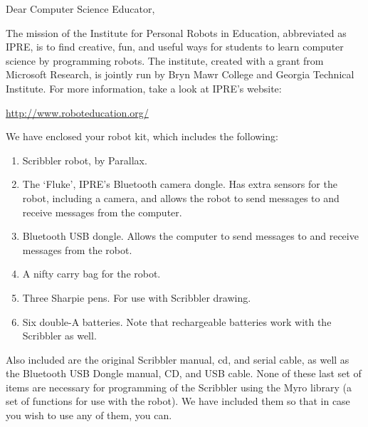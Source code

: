 \documentclass{letter}[10pt]
\begin{document}
\signature{Institute for Personal Robots in Education}

\address{Institute for Personal Robots in Education\\
Park Science Bldg, Room 251\\
Bryn Mawr College\\
101 North Merion Ave\\
Bryn Mawr, PA 19010\\
Tel. (610) 526-5024}

\begin{letter}{}

\opening{Dear Computer Science Educator,}

The mission of the Institute for Personal Robots in Education,
abbreviated as IPRE, is to find creative, fun, and useful ways for
students to learn computer science by programming robots.  The
institute, created with a grant from Microsoft Research, is jointly
run by Bryn Mawr College and Georgia Technical Institute.  For more
information, take a look at IPRE's website:

\url{http://www.roboteducation.org/}

We have enclosed your robot kit, which includes the following:

\begin{enumerate}
\item Scribbler robot, by Parallax.

\item The `Fluke', IPRE's Bluetooth camera dongle.  Has extra sensors
for the robot, including a camera, and allows the robot to send
messages to and receive messages from the computer.
\item Bluetooth USB dongle.  Allows the computer to send messages to
and receive messages from the robot.
\item A nifty carry bag for the robot.
\item Three Sharpie pens.  For use with Scribbler drawing.
\item Six double-A batteries.  Note that rechargeable batteries work
with the Scribbler as well.
\end{enumerate}

Also included are the original Scribbler manual, cd, and serial cable,
as well as the Bluetooth USB Dongle manual, CD, and USB cable. None of
these last set of items are necessary for programming of the Scribbler
using the Myro library (a set of functions for use with the robot).
We have included them so that in case you wish to use any of them, you
can.


\end{letter}
\end{document}
